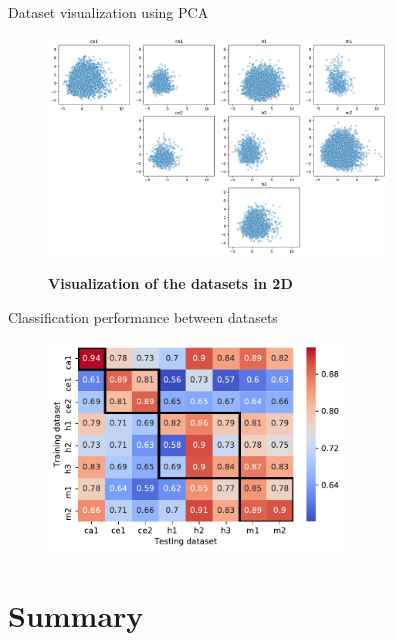\documentclass{beamer}
\begin{document}
\begin{frame}{Dataset visualization using PCA}
\begin{figure}[h!]
  \caption{\textbf{Visualization of the datasets in 2D}} 
       \includegraphics[width = 0.8\textwidth]{images/5_unite_features_pca_resample_scale=True_all.png}
      \label{fig:feature_pca}
      
      \end{figure}
\end{frame}

\begin{frame}{Classification performance between datasets}

\begin{figure}[h!]
      \includegraphics[width = 0.7\textwidth]{images/6_diff_summary.pdf}
    \label{fig:crossdataset}
    
      \end{figure}

\end{frame}

\section{Summary}
\end{document}
